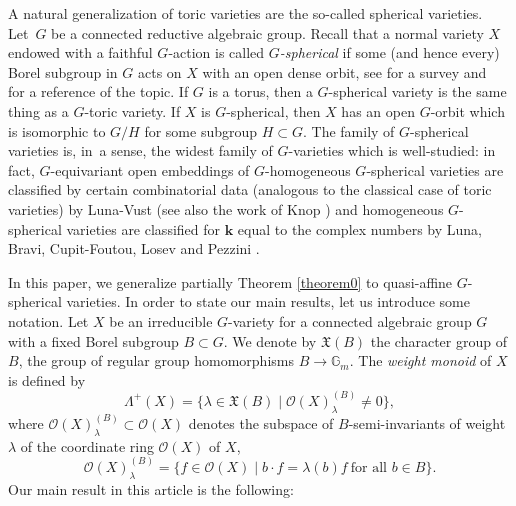 \documentclass[JEP,XML,SOM,Unicode]{cedram}
\let\mathcal\mathscr
\theoremstyle{plain}
\theoremstyle{definition}
\newcommand{\OO}{\mathcal{O}}
\newcommand{\GG}{\mathbb{G}}
\newcommand{\kk}{{\boldsymbol{k}}}
\newcommand{\name}[1]{#1}
\newcommand{\set}[2]{\{#1 \mid #2\}}
\begin{document}
A natural generalization of toric varieties are the so-called spherical varieties.
Let~$G$ be a connected reductive algebraic group.
Recall that a normal variety $X$ endowed with a faithful $G$-action
is called \emph{$G$-spherical} if some (and hence every)
Borel subgroup in $G$ acts on $X$ with an open dense orbit, see
\eg \cite{Br2010Introduction-to-ac} for a survey
and~\cite{Ti2011Homogeneous-spaces} for a reference of the topic. If $G$ is a torus, then a $G$-spherical variety is the same thing as a $G$-toric variety.
If $X$ is $G$-spherical, then
$X$ has an open $G$-orbit which is isomorphic to $G/H$ for some subgroup $H \subset G$.
The family of $G$-spherical varieties is, in~a sense, the widest family of $G$-varieties which is well-studied: in fact, $G$-equivariant open embeddings of $G$-homogeneous
$G$-spherical varieties are classified
by certain combinatorial data (analogous to the classical case of toric varieties)
by \name{Luna-Vust} \cite{LuVu1983Plongements-despac} (see also the work of \name{Knop} \cite{Kn1991The-Luna-Vust-theo})
and homogeneous $G$-spherical varieties are classified for $\kk$ equal to the complex numbers
by \name{Luna}, \name{Bravi}, \name{Cupit-Foutou}, \name{Losev} and \name{Pezzini}
\cite{Lu2001Varietes-spherique, BrPe2005Wonderful-varietie, Br2007Wonderful-varietie,
Lu2007La-variete-magnifi, Lo2009Uniqueness-propert, BrCu2010Classification-of-, Cu2014Wonderful-Varietie}.

In this paper, we generalize partially Theorem \ref{theorem0} to quasi-affine $G$-spherical varieties.
In order to state our main results, let us introduce some notation. Let
$X$ be an irreducible $G$-variety for a connected algebraic group $G$ with a fixed Borel subgroup
$B \subset G$.
We denote by $\mathfrak{X}(B)$ the character group
of $B$, \ie the group of regular group homomorphisms $B \to \GG_m$.
The \emph{weight monoid} of $X$ is defined by
\[
\Lambda^+(X) = \{\lambda \in \mathfrak{X}(B) \mid \OO(X)_{\lambda}^{(B)} \neq 0\},
\]
where $\OO(X)_{\lambda}^{(B)} \subset \OO(X)$
denotes the subspace of $B$-semi-invariants of weight $\lambda$
of the coordinate ring $\OO(X)$ of $X$, \ie
\[
\OO(X)_{\lambda}^{(B)} = \set{f \in \OO(X)}{b \cdot f = \lambda(b) f \ \textrm{for all $b \in B$}}.
\]
Our main result in this article is the following:
\end{document}
